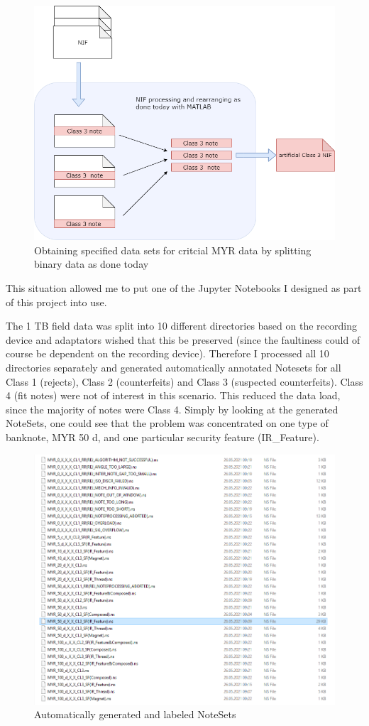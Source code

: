 \begin{figure}[!htb]
 \includegraphics[width=0.75\linewidth]{images/nif_chopping.png}
 \caption{Obtaining specified data sets for critcial MYR data by splitting binary data as done today}\label{fig:nif_chopping}
\end{figure}
This situation allowed me to put one of the Jupyter Notebooks I designed as part of this project into use.\par
The 1 TB field data was split into 10 different directories based on the recording device and adaptators wished that this be preserved (since the faultiness could of course be dependent on the recording device). Therefore I processed all 10 directories separately and generated automatically annotated Notesets for all Class 1 (rejects), Class 2 (counterfeits) and Class 3 (suspected counterfeits). Class 4 (fit notes) were not of interest in this scenario. This reduced the data load, since the majority of notes were Class 4. Simply by looking at the generated NoteSets, one could see that the problem was concentrated on one type of banknote, MYR 50 d,  and one particular security feature (IR\_Feature).
\begin{figure}[!htb]
 \includegraphics[width=0.75\linewidth]{images/myr_ns.png}
 \caption{Automatically generated and labeled NoteSets}\label{fig:myr_ns}
\end{figure} 

